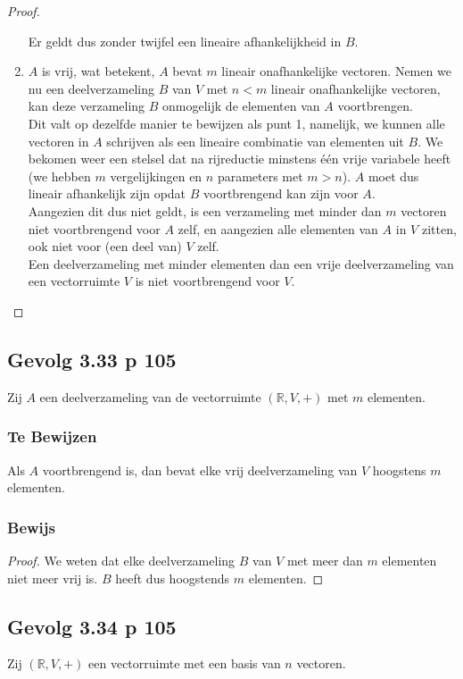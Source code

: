\documentclass[lineaire_algebra_oplossingen.tex]{subfiles}
\begin{document}
\begin{proof}
\begin{enumerate}
Er geldt dus zonder twijfel een lineaire afhankelijkheid in $B$.
\item
$A$ is vrij, wat betekent, $A$ bevat $m$ lineair onafhankelijke vectoren. Nemen we nu een deelverzameling $B$ van $V$ met $n<m$ lineair onafhankelijke vectoren, kan deze verzameling $B$ onmogelijk de elementen van $A$ voortbrengen.\\
Dit valt op dezelfde manier te bewijzen als punt 1, namelijk, we kunnen alle vectoren in $A$ schrijven als een lineaire combinatie van elementen uit $B$. We bekomen weer een stelsel dat na rijreductie minstens \'e\'en vrije variabele heeft (we hebben $m$ vergelijkingen en $n$ parameters met $m>n$). $A$ moet dus lineair afhankelijk zijn opdat $B$ voortbrengend kan zijn voor $A$.\\ Aangezien dit dus niet geldt, is een verzameling met minder dan $m$ vectoren niet voortbrengend voor $A$ zelf, en aangezien alle elementen van $A$ in $V$ zitten, ook niet voor (een deel van) $V$ zelf.\\
Een deelverzameling met minder elementen dan een vrije deelverzameling van een vectorruimte $V$ is niet voortbrengend voor $V$.
\end{enumerate}
\end{proof}

\subsection{Gevolg 3.33 p 105}
Zij $A$ een deelverzameling van de vectorruimte $(\mathbb{R},V,+)$ met $m$ elementen.
\subsubsection*{Te Bewijzen}
Als $A$ voortbrengend is, dan bevat elke vrij deelverzameling van $V$ hoogstens $m$ elementen.
\subsubsection*{Bewijs}
\begin{proof}
We weten dat elke deelverzameling $B$ van $V$ met meer dan $m$ elementen niet meer vrij is. $B$ heeft dus hoogstends $m$ elementen.
\end{proof}

\subsection{Gevolg 3.34 p 105}
Zij $(\mathbb{R},V,+)$ een vectorruimte met een basis van $n$ vectoren.
\end{document}

